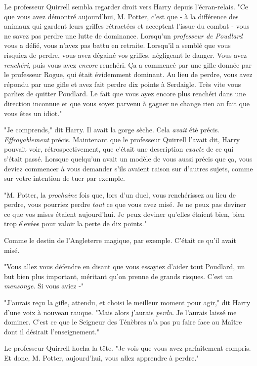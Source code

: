 Le professeur Quirrell sembla regarder droit vers Harry depuis l'écran-relais. "Ce que vous avez démontré aujourd'hui, M. Potter, c'est que - à la différence des animaux qui gardent leurs griffes rétractées et acceptent l'issue du combat - vous ne savez pas perdre une lutte de dominance. Lorsqu'un \emph{professeur de Poudlard} vous a défié, vous n'avez pas battu en retraite. Lorsqu'il a semblé que vous risquiez de perdre, vous avez dégainé vos griffes, négligeant le danger. Vous avez \emph{renchéri}, puis vous avez \emph{encore} renchéri. Ça a commencé par une gifle donnée par le professeur Rogue, qui était évidemment dominant. Au lieu de perdre, vous avez répondu par une gifle et avez fait perdre dix points à Serdaigle. Très vite vous parliez de quitter Poudlard. Le fait que vous ayez encore plus renchéri dans une direction inconnue et que vous soyez parvenu à gagner ne change rien au fait que vous êtes un idiot."

"Je comprends," dit Harry. Il avait la gorge sèche. Cela \emph{avait} été précis. \emph{Effroyablement} précis. Maintenant que le professeur Quirrell l'avait dit, Harry pouvait voir, rétrospectivement, que c'était une description \emph{exacte} de ce qui s'était passé. Lorsque quelqu'un avait un modèle de vous aussi précis que ça, vous deviez commencer à vous demander s'ils avaient raison sur d'autres sujets, comme sur votre intention de tuer par exemple.

"M. Potter, la \emph{prochaine} fois que, lors d'un duel, vous renchérissez au lieu de perdre, vous pourriez perdre \emph{tout} ce que vous avez misé. Je ne peux pas deviner ce que vos mises étaient aujourd'hui. Je peux deviner qu'elles étaient bien, bien trop élevées pour valoir la perte de dix points."

Comme le destin de l'Angleterre magique, par exemple. C'était ce qu'il avait misé.

"Vous allez vous défendre en disant que vous essayiez d'aider tout Poudlard, un but bien plus important, méritant qu'on prenne de grands risques. C'est un \emph{mensonge}. Si vous aviez -"

"J'aurais reçu la gifle, attendu, et choisi le meilleur moment pour agir," dit Harry d'une voix à nouveau rauque. "Mais alors j'aurais \emph{perdu}. Je l'aurais laissé me dominer. C'est ce que le Seigneur des Ténèbres n'a pas pu faire face au Maître dont il désirait l'enseignement."

Le professeur Quirrell hocha la tête. "Je vois que vous avez parfaitement compris. Et donc, M. Potter, aujourd'hui, vous allez apprendre à perdre."

